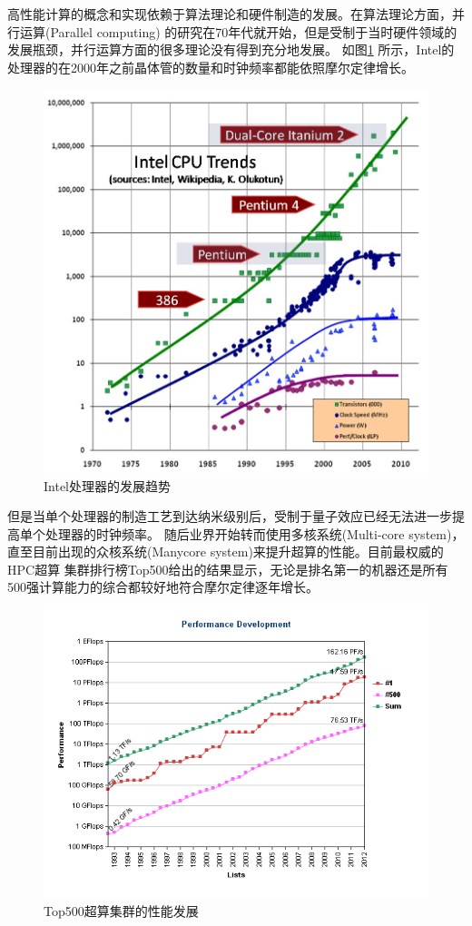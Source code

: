 高性能计算的概念和实现依赖于算法理论和硬件制造的发展。在算法理论方面，并行运算(Parallel computing)
的研究在70年代就开始，但是受制于当时硬件领域的发展瓶颈，并行运算方面的很多理论没有得到充分地发展。
如图\ref{fig:intelProcessor} 所示，Intel的处理器的在2000年之前晶体管的数量和时钟频率都能依照摩尔定律增长。
\begin{figure}
	\centering
	\includegraphics[width=\textwidth]{chap1/Figures/CPU-Scaling.jpg}
	\caption{Intel处理器的发展趋势}
	\label{fig:intelProcessor}
\end{figure}
但是当单个处理器的制造工艺到达纳米级别后，受制于量子效应已经无法进一步提高单个处理器的时钟频率。
随后业界开始转而使用多核系统(Multi-core system)，直至目前出现的众核系统(Manycore system)来提升超算的性能。目前最权威的HPC超算
集群排行榜Top500给出的结果显示，无论是排名第一的机器还是所有500强计算能力的综合都较好地符合摩尔定律逐年增长。
\begin{figure}
	\centering
	\includegraphics[width=\textwidth]{chap1/Figures/top500Perf.png}
	\caption{Top500超算集群的性能发展}
	\label{fig:top500Perf}
\end{figure}
